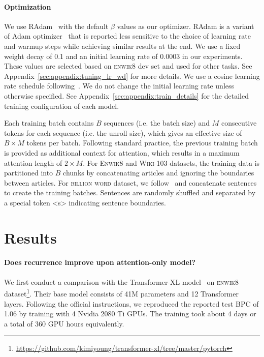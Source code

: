 \paragraph{Optimization}
We use RAdam~\cite{liu2019radam} with the default $\beta$ values as our optimizer.
RAdam is a variant of Adam optimizer~\cite{Kingma:14adam} that is reported less sensitive to the choice of learning rate and warmup steps while achieving similar results at the end.
We use a fixed weight decay of 0.1 and an initial learning rate of 0.0003 in our experiments.
These values are selected based on \textsc{enwik8} dev set and used for other tasks.
See Appendix~\ref{sec:appendix:tuning_lr_wd} for more details.
We use a cosine learning rate schedule following~\citet{dai-etal-2019-transformer}.
We do not change the initial learning rate unless otherwise specified.
See Appendix~\ref{sec:appendix:train_details} for the detailed training configuration of each model.

Each training batch contains $B$ sequences (i.e. the batch size) and $M$ consecutive tokens for each sequence (i.e. the unroll size), which gives an effective size of $B\times M$ tokens per batch.
Following standard practice, the previous training batch is provided as additional context for attention, which results in a maximum attention length of $2\times M$.
For \textsc{Enwik8} and \textsc{Wiki-103} datasets, the training data is partitioned into $B$ chunks by concatenating articles and ignoring the boundaries between articles.
For \textsc{billion word} dataset, we follow~\citet{dai-etal-2019-transformer} and concatenate sentences to create the training batches.
Sentences are randomly shuffled and separated by a special token <s> indicating sentence boundaries.

\section{Results}
\label{sec:results}

\paragraph{Does recurrence improve upon attention-only model?}
We first conduct a comparison with the Transformer-XL model~\cite{dai-etal-2019-transformer} on \textsc{enwik8} dataset\footnote{\url{https://github.com/kimiyoung/transformer-xl/tree/master/pytorch}}.
Their base model consists of 41M parameters and 12 Transformer layers.
Following the official instructions, we reproduced the reported test BPC of 1.06 by training with 4 Nvidia 2080 Ti GPUs.
The training took about 4 days or a total of 360 GPU hours equivalently.

